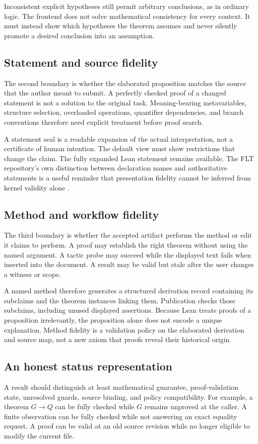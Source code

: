 \documentclass[11pt,a4paper]{article}
\theoremstyle{plain}
\theoremstyle{definition}
\theoremstyle{remark}
\begin{document}
Inconsistent explicit hypotheses still permit arbitrary conclusions, as in
ordinary logic. The frontend does not solve mathematical consistency for every
context. It must instead show which hypotheses the theorem assumes and never
silently promote a desired conclusion into an assumption.

\subsection{Statement and source fidelity}
The second boundary is whether the elaborated proposition matches the source
that the author meant to submit. A perfectly checked proof of a changed
statement is not a solution to the original task. Meaning-bearing metavariables,
structure selection, overloaded operations, quantifier dependencies, and
branch conventions therefore need explicit treatment before proof search.

A statement seal is a readable expansion of the actual interpretation, not
a certificate of human intention. The default view must show restrictions
that change the claim. The fully expanded Lean statement remains available.
The FLT repository's own distinction between declaration names and authoritative
statements is a useful reminder that presentation fidelity cannot be inferred
from kernel validity alone \cite{fltreadme}.

\subsection{Method and workflow fidelity}
The third boundary is whether the accepted artifact performs the method or edit
it claims to perform. A proof may establish the right theorem without using
the named argument. A tactic probe may succeed while the displayed text fails
when inserted into the document. A result may be valid but stale after the
user changes a witness or scope.

A named method therefore generates a structured derivation record containing
its subclaims and the theorem instances linking them. Publication checks those
subclaims, including unused displayed assertions. Because Lean treats proofs
of a proposition irrelevantly, the proposition alone does not encode a unique
explanation. Method fidelity is a validation policy on the elaborated derivation
and source map, not a new axiom that proofs reveal their historical origin.

\subsection{An honest status representation}
A result should distinguish at least mathematical guarantee, proof-validation
state, unresolved guards, source binding, and policy compatibility. For example,
a theorem $G\to Q$ can be fully checked while $G$ remains unproved at the
caller. A finite observation can be fully checked while not answering an exact
equality request. A proof can be valid at an old source revision while no
longer eligible to modify the current file.
\end{document}
